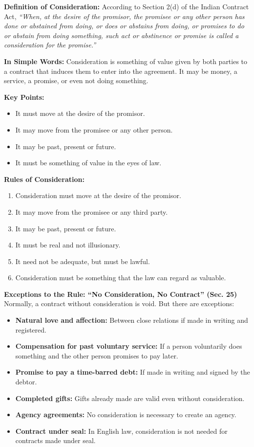 \documentclass[12pt,a4paper]{book}
\begin{document}
\textbf{Definition of Consideration:}  
According to Section 2(d) of the Indian Contract Act,  
\textit{“When, at the desire of the promisor, the promisee or any other person has done or abstained from doing, or does or abstains from doing, or promises to do or abstain from doing something, such act or abstinence or promise is called a consideration for the promise.”}

\textbf{In Simple Words:}  
Consideration is something of value given by both parties to a contract that induces them to enter into the agreement. It may be money, a service, a promise, or even not doing something.

\vspace{0.3cm}
\textbf{Key Points:}
\begin{itemize}
    \item It must move at the desire of the promisor.
    \item It may move from the promisee or any other person.
    \item It may be past, present or future.
    \item It must be something of value in the eyes of law.
\end{itemize}

\vspace{0.5cm}
\textbf{Rules of Consideration:}
\begin{enumerate}
    \item Consideration must move at the desire of the promisor.
    \item It may move from the promisee or any third party.
    \item It may be past, present or future.
    \item It must be real and not illusionary.
    \item It need not be adequate, but must be lawful.
    \item Consideration must be something that the law can regard as valuable.
\end{enumerate}

\vspace{0.5cm}
\textbf{Exceptions to the Rule: “No Consideration, No Contract” (Sec. 25)}  
Normally, a contract without consideration is void. But there are exceptions:
\begin{itemize}
    \item \textbf{Natural love and affection:} Between close relations if made in writing and registered.
    \item \textbf{Compensation for past voluntary service:} If a person voluntarily does something and the other person promises to pay later.
    \item \textbf{Promise to pay a time-barred debt:} If made in writing and signed by the debtor.
    \item \textbf{Completed gifts:} Gifts already made are valid even without consideration.
    \item \textbf{Agency agreements:} No consideration is necessary to create an agency.
    \item \textbf{Contract under seal:} In English law, consideration is not needed for contracts made under seal.
\end{itemize}
\end{document}
